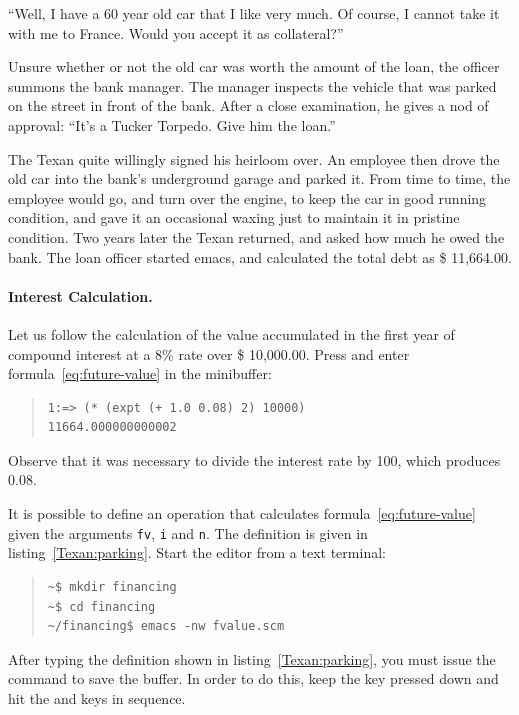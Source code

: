 \documentclass[a4paper,12pt]{book}
\begin{document}
“Well, I have a 60 year old car that I like very much.
Of course, I cannot take it with me to France.
Would you accept it as collateral?”

Unsure whether or not the old car was worth the
amount of the loan, the officer summons the bank manager.
The manager inspects the vehicle that was parked on the
street in front of the bank. After a close examination,
he gives a nod of approval: “It’s a Tucker Torpedo.
Give him the loan.”

The Texan quite willingly signed his heirloom over.
An employee then drove the old car into the bank’s
underground garage and parked it. From time to time,
the employee would go, and turn over the engine, to keep
the car in good running condition, and gave it an
occasional waxing just to maintain it in pristine condition.
Two years later the Texan returned, and asked how
much he owed the bank. The loan officer started emacs,
and calculated the total debt as \$ 11,664.00.

\paragraph{Interest Calculation.}
Let us follow the calculation of the value accumulated
in the first year of compound interest at a 8\% rate
over \$ 10,000.00. Press  and
enter formula~\ref{eq:future-value} in the minibuffer:
\begin{quote}
\begin{verbatim}
1:=> (* (expt (+ 1.0 0.08) 2) 10000)
11664.000000000002
\end{verbatim}
\end{quote}
Observe that it was necessary to divide the
interest rate by 100, which produces 0.08.

It is possible to define an operation that
calculates formula~\ref{eq:future-value}
given the arguments \verb|fv|, \verb|i|
and \verb|n|. The definition is given
in listing~\ref{Texan:parking}.
Start the editor from a text terminal:
\begin{quote}
\begin{verbatim}
~$ mkdir financing
~$ cd financing
~/financing$ emacs -nw fvalue.scm
\end{verbatim}
\end{quote}
After typing the definition shown
in listing~\ref{Texan:parking},
you must issue the 
command to save the buffer.
In order to do this, keep the
 key pressed down and
hit the  and
 keys in sequence.
\end{document}
